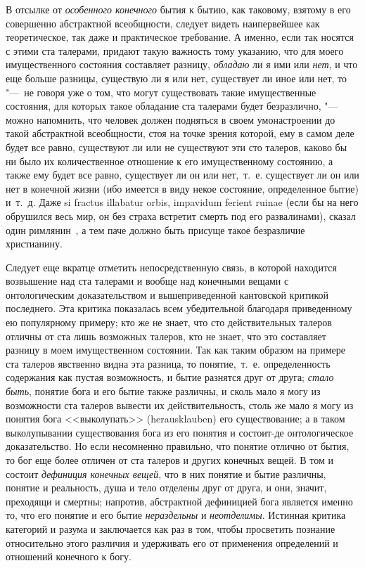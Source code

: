 В отсылке от {\em особенного конечного} бытия к бытию,
как таковому, взятому в его совершенно абстрактной всеобщности, следует
видеть наипервейшее как теоретическое, так даже и практическое требование.
А именно, если так носятся с этими ста талерами, придают такую важность
тому указанию, что для моего имущественного состояния составляет разницу,
{\em обладаю} ли я ими или
{\em нет}, и что еще больше разницы, существую ли я или
нет, существует ли иное или нет, то "---~не говоря уже о том, что могут
существовать такие имущественные состояния, для которых такое обладание ста
талерами будет безразлично, "--- можно напомнить, что человек должен подняться
в своем умонастроении до такой абстрактной всеобщности, стоя на точке
зрения которой, ему в самом деле будет все равно, существуют ли или не
существуют эти сто талеров, каково бы ни было их количественное отношение к
его имущественному состоянию, а также ему будет все равно, существует ли он
или нет,~т.~е. существует ли он или нет в конечной жизни (ибо имеется в
виду некое состояние, определенное бытие) и~т.~д. Даже si fractus illabatur
orbis, impavidum ferient ruinae (если бы на него обрушился весь мир, он без
страха встретит смерть под его развалинами), сказал один
римлянин~, а тем паче должно быть присуще такое
безразличие христианину.

Следует еще вкратце отметить непосредственную связь, в которой находится
возвышение над ста талерами и вообще над конечными вещами с онтологическим
доказательством и вышеприведенной кантовской критикой последнего. Эта
критика показалась всем убедительной благодаря приведенному ею популярному
примеру; кто же не знает, что сто действительных талеров отличны от ста
лишь возможных талеров, кто не знает, что это составляет разницу в моем
имущественном состоянии. Так как таким образом на примере ста талеров
явственно видна эта разница, то понятие,~т.~е. определенность содержания
как пустая возможность, и бытие разнятся друг от друга;
{\em стало быть}, понятие бога и его бытие также
различны, и сколь мало я могу из возможности ста талеров вывести их
действительность, столь же мало я могу из понятия бога <<выколупать>>
(herausklauben) его существование; а в таком выколупывании существования
бога из его понятия и состоит-де онтологическое доказательство. Но если
несомненно правильно, что понятие отлично от бытия, то бог еще более
отличен от ста талеров и других конечных вещей. В том и состоит
{\em дефиниция конечных вещей}, что в них понятие и
бытие различны, понятие и реальность, душа и тело отделены друг от друга, и
они, значит, преходящи и смертны; напротив, абстрактной дефиницией бога
является именно то, что его понятие и его бытие
{\em нераздельны} и
{\em неотделимы}. Истинная критика категорий и разума и
заключается как раз в том, чтобы просветить познание относительно этого
различия и удерживать его от применения определений и отношений конечного к
богу.\label{bkm:bm85b}

